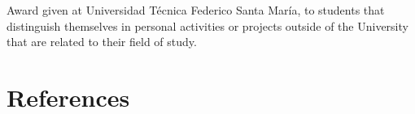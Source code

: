 \documentclass[10pt, a4paper, dvips]{moderncv}
\begin{document}
{
\begin{scriptsize}
Award given at Universidad T\'ecnica Federico Santa Mar\'ia, to students that distinguish themselves in personal activities or projects outside of the University that are related to their field of study.
\end{scriptsize}
}

\nocite{*}


\section{References}
{
}
\end{document}
